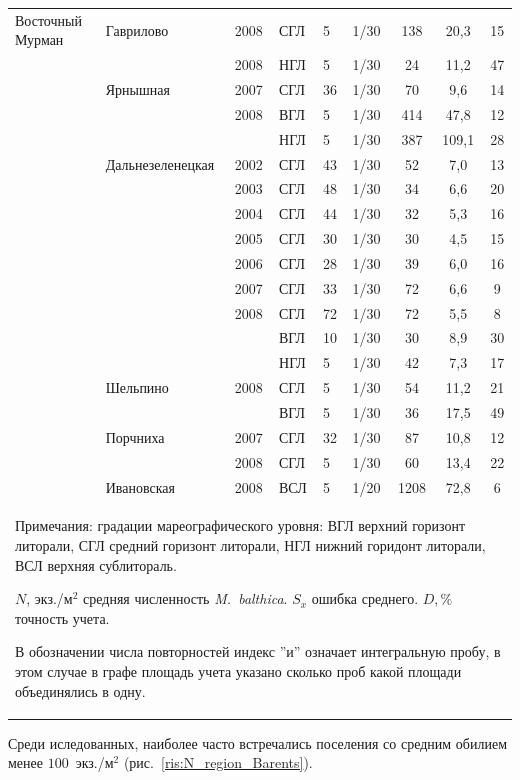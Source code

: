 \documentclass[12pt, a4paper]{disser}
\begin{document}
\begin{footnotesize}
\begin{longtable}{|p{2cm}|p{3cm}|p{1cm}|p{2cm}|p{1.5cm}|p{1cm}|*{3}{c|}}
		\\ \hline
	Восточный Мурман & Гаврилово & 2008 & СГЛ & 5 & 1/30 & 138 & 20,3 & 15
		\\ \cline{4-9}
		 &  & 2008 & НГЛ & 5 & 1/30 & 24 & 11,2 & 47
		\\ \cline{2-9}
		 & Ярнышная & 2007 & СГЛ & 36 & 1/30 & 70 & 9,6 & 14
		\\ \cline{3-9}
		 &  & 2008 & ВГЛ & 5 & 1/30 & 414 & 47,8 & 12
		\\ \cline{4-9}
		 &  & & НГЛ & 5 & 1/30 & 387 & 109,1 & 28
		\\ \cline{2-9}
		 & Дальнезеленецкая & 2002 & СГЛ & 43 & 1/30 & 52 & 7,0 & 13
		\\ \cline{3-9}
		 &  & 2003 & СГЛ & 48 & 1/30 & 34 & 6,6 & 20
		\\ \cline{3-9}
		 &  & 2004 & СГЛ & 44 & 1/30 & 32 & 5,3 & 16
		\\ \cline{3-9}
		 &  & 2005 & СГЛ & 30 & 1/30 & 30 & 4,5 & 15
		\\ \cline{3-9}
		 &  & 2006 & СГЛ & 28 & 1/30 & 39 & 6,0 & 16
		\\ \cline{3-9}
		 &  & 2007 & СГЛ & 33 & 1/30 & 72 & 6,6 & 9
		\\ \cline{3-9}
		 &  & 2008 & СГЛ & 72 & 1/30 & 72 & 5,5 & 8
		\\ \cline{4-9}
		 &  &  & ВГЛ & 10 & 1/30 & 30 & 8,9 & 30
		\\ \cline{4-9}
		 &  &  & НГЛ & 5 & 1/30 & 42 & 7,3 & 17
		\\ \cline{2-9}
		 & Шельпино & 2008 & СГЛ & 5 & 1/30 & 54 & 11,2 & 21
		\\ \cline{4-9}
		 &  &  & ВГЛ & 5 & 1/30 & 36 & 17,5 & 49
		\\ \cline{2-9}
		 & Порчниха & 2007 & СГЛ & 32 & 1/30 & 87 & 10,8 & 12
		\\ \cline{3-9}
		 &  & 2008 & СГЛ & 5 & 1/30 & 60 & 13,4 & 22
		\\ \cline{2-9}
		 & Ивановская & 2008 & ВСЛ & 5 & 1/20 & 1208 & 72,8 & 6
		\\ \hline
	\multicolumn{9}{p{16cm}}{Примечания: градации мареографического уровня: ВГЛ \textemdash верхний горизонт литорали, СГЛ \textemdash средний 	горизонт литорали, НГЛ \textemdash нижний горидонт литорали, ВСЛ \textemdash верхняя сублитораль. 

	$N$, экз./м$^2$ \textemdash средняя численность {\it M.~balthica}. 
	$S_x$ \textemdash ошибка среднего.
	 $D, \%$ \textemdash  точность учета.
	
	В обозначении числа повторностей индекс ''и'' означает интегральную пробу, в этом случае в графе площадь учета указано сколько проб какой площади 	объединялись в одну.}
	\end{longtable}
	\end{footnotesize}
%
Среди иследованных, наиболее часто встречались поселения со средним обилием менее $100$~экз./м$^2$ (рис.~\ref{ris:N_region_Barents}).
\end{document}
